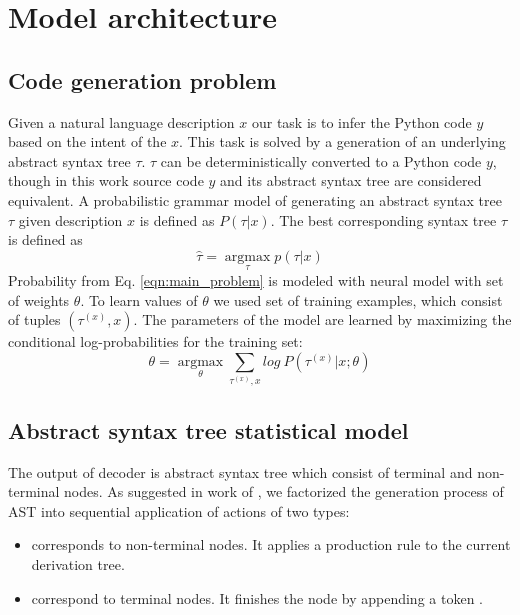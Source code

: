 \chapter{Model architecture} 
\label{Chapter4}

\section{Code generation problem}
Given a natural language description $x$ our task is to infer the Python code $y$ based on the intent of the $x$. This task is solved by a generation of an underlying abstract syntax tree $\tau$. $\tau$ can be deterministically converted to a Python code $y$, though in this work source code $y$ and its abstract syntax tree are considered equivalent. A probabilistic grammar model of generating an abstract syntax tree $\tau$ given description $x$ is defined as $P(\tau|x)$. The best corresponding syntax tree $\tau$ is defined as
\begin{equation}
\hat{\tau}=\underset{\tau}{\operatorname{argmax}} p(\tau|x)
\label{eqn:main_problem}
\end{equation}
Probability from Eq. \ref{eqn:main_problem} is modeled with neural model with set of weights $\theta$. To learn values of $\theta$ we used set of training examples, which consist of tuples $(\tau^{(x)}, x)$. The parameters of the model are learned by maximizing the conditional log-probabilities for the training set:
\begin{equation}
\theta=\underset{\theta}{\operatorname{argmax}} \sum_{\tau^{(x)}, x} log \: P(\tau^{(x)}|x; \theta)
\label{eqn:mle}
\end{equation}

\section{Abstract syntax tree statistical model}
The output of decoder is abstract syntax tree which consist of terminal and non-terminal nodes. As suggested in work of \cite{Yin2017}, we factorized the generation process of AST into sequential application of actions of two types:
\begin{itemize}
	\item {} corresponds to non-terminal nodes. It applies a production rule  to the current derivation tree.
	\item {} correspond to terminal nodes. It finishes the node by appending a token .
\end{itemize}

